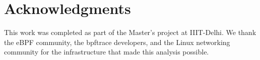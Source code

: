\documentclass[11pt,a4paper]{article}
\begin{document}
\section*{Acknowledgments}

This work was completed as part of the Master's project at IIIT-Delhi. We thank the eBPF community, the bpftrace developers, and the Linux networking community for the infrastructure that made this analysis possible.



\end{document}

